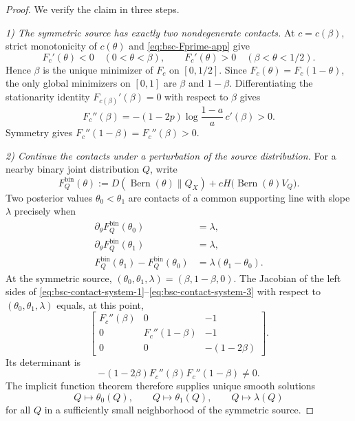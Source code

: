 \documentclass[10pt,a4paper]{amsart}
\newcommand{\Bern}{\operatorname{Bern}}
\begin{document}
\begin{proof}
We verify the claim in three steps.

\emph{1) The symmetric source has exactly two nondegenerate contacts.}
At $c=c(\beta)$, strict monotonicity of $c(\theta)$ and \eqref{eq:bsc-Fprime-app} give
\begin{equation}
F_c'(\theta)<0\quad(0<\theta<\beta),
\qquad
F_c'(\theta)>0\quad(\beta<\theta<1/2).
\end{equation}
Hence $\beta$ is the unique minimizer of $F_c$ on $[0,1/2]$.  Since $F_c(\theta)=F_c(1-\theta)$, the only global minimizers on $[0,1]$ are $\beta$ and $1-\beta$.  Differentiating the stationarity identity $F_{c(\beta)}'(\beta)=0$ with respect to $\beta$ gives
\begin{equation}
F_c''(\beta)
=-(1-2p)\log\frac{1-a}{a}\,c'(\beta)>0.
\label{eq:bsc-positive-hessian}
\end{equation}
Symmetry gives $F_c''(1-\beta)=F_c''(\beta)>0$.

\emph{2) Continue the contacts under a perturbation of the source distribution.}
For a nearby binary joint distribution $Q$, write
\begin{equation}
F_Q^{\mathrm{bin}}(\theta)
:=D(\Bern(\theta)\|Q_X)
+cH\bigl(\Bern(\theta)V_Q\bigr).
\end{equation}
Two posterior values $\theta_0<\theta_1$ are contacts of a common supporting line with slope $\lambda$ precisely when
\begin{align}
\partial_\theta F_Q^{\mathrm{bin}}(\theta_0)&=\lambda,
\label{eq:bsc-contact-system-1}\\
\partial_\theta F_Q^{\mathrm{bin}}(\theta_1)&=\lambda,
\label{eq:bsc-contact-system-2}\\
F_Q^{\mathrm{bin}}(\theta_1)-F_Q^{\mathrm{bin}}(\theta_0)
&=\lambda(\theta_1-\theta_0).
\label{eq:bsc-contact-system-3}
\end{align}
At the symmetric source, $(\theta_0,\theta_1,\lambda)=(\beta,1-\beta,0)$.  The Jacobian of the left sides of \eqref{eq:bsc-contact-system-1}--\eqref{eq:bsc-contact-system-3} with respect to $(\theta_0,\theta_1,\lambda)$ equals, at this point,
\begin{equation}
\begin{bmatrix}
F_c''(\beta)&0&-1\\
0&F_c''(1-\beta)&-1\\
0&0&-(1-2\beta)
\end{bmatrix}.
\label{eq:bsc-contact-jacobian}
\end{equation}
Its determinant is
\begin{equation}
-(1-2\beta)F_c''(\beta)F_c''(1-\beta)\ne0.
\end{equation}
The implicit function theorem therefore supplies unique smooth solutions
\begin{equation}
Q\longmapsto\theta_0(Q),\qquad
Q\longmapsto\theta_1(Q),\qquad
Q\longmapsto\lambda(Q)
\end{equation}
for all $Q$ in a sufficiently small neighborhood of the symmetric source.


\end{proof}
\end{document}

